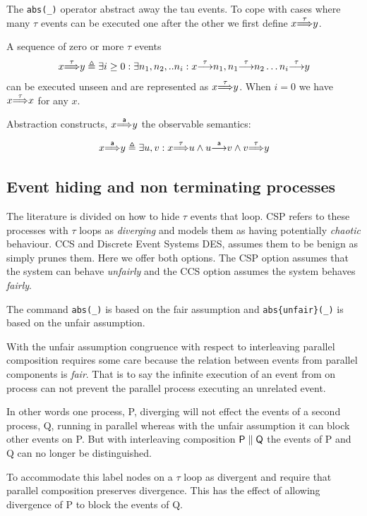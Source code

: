 \documentclass[]{article}
\begin{document}
 
 The \verb|abs(_)|  operator abstract away the {\sf tau} events. To cope with cases where many $\tau$ events can be executed one after the other we first define  ${x}{\stackrel{\tau}{\Longrightarrow}}{y} $.
  
  A sequence of zero or more $\tau$ events 
  \[{x}{\stackrel{\tau}{\Longrightarrow}}{y}  \triangleq \exists i\geq 0 : \exists n_1,n_2,..n_i :{x}{\stackrel{\tau}{\longrightarrow}}{n_1} , {n_1}{\stackrel{\tau}{\longrightarrow}}{n_2} \ldots {n_i}{\stackrel{\tau}{\longrightarrow}}{y} \]
   can be  executed unseen and are represented as ${x}{\stackrel{\tau}{\Longrightarrow}}{y} $. When $i=0$ we have ${x}{\stackrel{\tau}{\Longrightarrow}}{x} $ for any $x$.
 
 
 Abstraction constructs, ${x}{\stackrel{\sf a}{\Longrightarrow}}{y} $ the observable semantics:
 
   
   \[{x}{\stackrel{\sf a}{\Longrightarrow}}{y}   \triangleq \exists u,v :   {x}{\stackrel{\sf \tau}{\Longrightarrow}}{u}  \land  {u}{\stackrel{\sf a}{\longrightarrow}}{v}   \land {v}{\stackrel{\sf \tau}{\Longrightarrow}}{y}  
 \]

 
 \subsection{Event hiding and non terminating processes }
 
 The literature is divided on how to hide $\tau$ events that loop.  CSP  refers to these processes with $\tau$ loops  as \emph{diverging} and models them as having potentially \emph{chaotic} behaviour. CCS   and Discrete Event Systems DES, assumes them to be benign as simply prunes them. Here we offer both options. The CSP option assumes that the system can behave \emph{unfairly} and the CCS option assumes the system behaves \emph{fairly}.
 
 
 
 The command \verb|abs(_)| is based on the fair assumption and \verb|abs{unfair}(_)| is based on the unfair assumption. 
 


With the unfair assumption congruence with respect to interleaving parallel composition requires some care because the relation  between events from parallel components is \emph{fair}. That is to say the infinite execution of an event from on process can not prevent the parallel process executing an unrelated event. 

In other words one process, {\sf P},  diverging will not effect the events of a second process, {\sf Q},  running in parallel whereas with the unfair assumption it can block other events on {\sf P}. But with interleaving composition ${\sf P\parallel Q}$ the events of {\sf P} and {\sf Q} can no longer be distinguished. 

To accommodate this label nodes on a $\tau$ loop as divergent and require that parallel composition preserves divergence. This has the effect of allowing divergence of {\sf P} to block the events of {\sf Q}.
\end{document}
